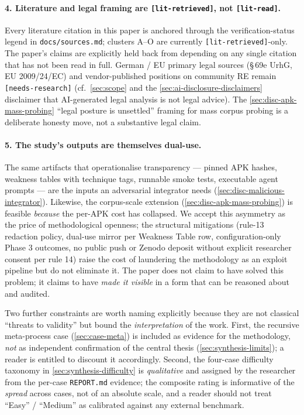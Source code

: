 \documentclass[11pt,a4paper]{article}
\begin{document}
\paragraph{4. Literature and legal framing are \texttt{[lit-retrieved]}, not \texttt{[lit-read]}.}
Every literature citation in this paper is anchored through the
verification-status legend in \texttt{docs/sources.md}; clusters A--O
are currently \texttt{[lit-retrieved]}-only. The paper's claims are
explicitly held back from depending on any single citation that has
not been read in full. German / EU primary legal sources (\S{}\,69e
UrhG, EU 2009/24/EC) and vendor-published positions on community RE
remain \texttt{[needs-research]} (cf.\ \cref{sec:scope} and
the \cref{sec:ai-disclosure-disclaimers} disclaimer that AI-generated legal
analysis is not legal advice). The
\cref{sec:disc-apk-mass-probing} ``legal posture is unsettled''
framing for mass corpus probing is a deliberate honesty move, not a
substantive legal claim.

\paragraph{5. The study's outputs are themselves dual-use.}
The same artifacts that operationalise transparency --- pinned APK
hashes, weakness tables with technique tags, runnable smoke tests,
executable agent prompts --- are the inputs an adversarial integrator
needs (\cref{sec:disc-malicious-integrator}). Likewise, the
corpus-scale extension (\cref{sec:disc-apk-mass-probing}) is feasible
\emph{because} the per-APK cost has collapsed. We accept this
asymmetry as the price of methodological openness; the structural
mitigations (rule-13 redaction policy, dual-use mirror per Weakness
Table row, configuration-only Phase 3 outcomes, no public push or
Zenodo deposit without explicit researcher consent per rule 14) raise
the cost of laundering the methodology as an exploit pipeline but do
not eliminate it. The paper does not claim to have solved this
problem; it claims to have \emph{made it visible} in a form that can
be reasoned about and audited.

Two further constraints are worth naming explicitly because they are
not classical ``threats to validity'' but bound the \emph{interpretation}
of the work. First, the recursive meta-process case
(\cref{sec:case-meta}) is included as evidence for the methodology,
\emph{not} as independent confirmation of the central thesis
(\cref{sec:synthesis-limits}); a reader is entitled to discount it
accordingly. Second, the four-case difficulty taxonomy in
\cref{sec:synthesis-difficulty} is \emph{qualitative} and assigned by
the researcher from the per-case \texttt{REPORT.md} evidence; the
composite rating is informative of the \emph{spread} across cases,
not of an absolute scale, and a reader should not treat ``Easy'' /
``Medium'' as calibrated against any external benchmark.
\end{document}
